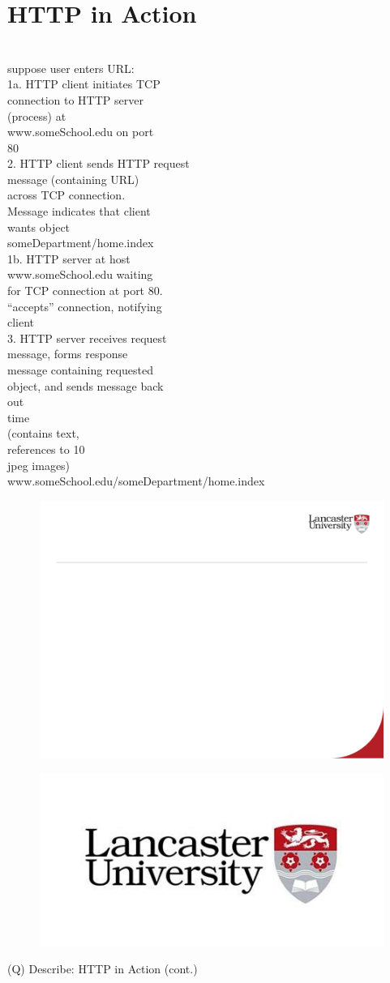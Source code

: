 \documentclass[12pt]{article}
\begin{document}
\section{HTTP in Action}
\\
suppose user enters URL:\\
1a. HTTP client initiates TCP \\
connection to HTTP server \\
(process) at \\
www.someSchool.edu on port \\
80\\
2. HTTP client sends HTTP request \\
message (containing URL) \\
across TCP connection. \\
Message indicates that client \\
wants object \\
someDepartment/home.index\\
1b. HTTP server at host \\
www.someSchool.edu waiting \\
for TCP connection at port 80.  \\
“accepts” connection, notifying \\
client\\
3. HTTP server receives request \\
message, forms response \\
message containing requested \\
object, and sends message back \\
out\\
time\\
(contains text, \\
references to 10 \\
jpeg images)\\
www.someSchool.edu/someDepartment/home.index\\
\begin{figure}[H]
\includegraphics[width=0.5\linewidth]{page24-image-1.png}
\end{figure}
\begin{figure}[H]
\includegraphics[width=0.5\linewidth]{page24-image-2.png}
\end{figure}
\clearpage
(Q)
Describe: HTTP in Action (cont.)
\clearpage
\end{document}
